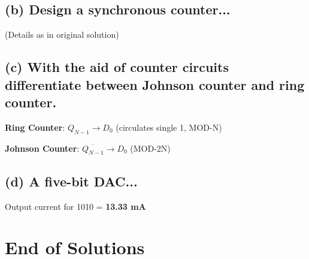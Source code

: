 \documentclass[11pt,a4paper]{article}
\begin{document}
\subsection*{(b) Design a synchronous counter...}
(Details as in original solution)

\subsection*{(c) With the aid of counter circuits differentiate between Johnson counter and ring counter.}

\textbf{Ring Counter}: $Q_{N-1} \to D_0$ (circulates single 1, MOD-N)

\textbf{Johnson Counter}: $\overline{Q_{N-1}} \to D_0$ (MOD-2N)

\subsection*{(d) A five-bit DAC...}
Output current for 1010 = \textbf{13.33 mA}

\section*{End of Solutions}
\end{document}
